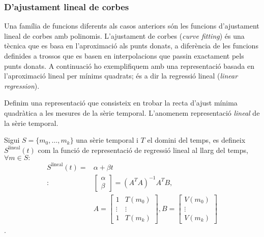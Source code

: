 \subsubsection{D'ajustament lineal de corbes}


Una família de funcions diferents als casos anteriors són les funcions
d'ajustament lineal de corbes amb polinomis.  L'ajustament de corbes
(\emph{curve fitting}) és una tècnica que es basa en l'aproximació als
punts donats, a diferència de les funcions definides a trossos que es
basen en interpolacions que passin exactament pels punts donats.  A
continuació ho exemplifiquem amb una representació basada en
l'aproximació lineal per mínims quadrats; és a dir la regressió lineal
(\emph{linear regression}).


Definim una representació que consisteix en trobar la recta d'ajust
mínima quadràtica a les mesures de la sèrie temporal. L'anomenem
representació \emph{lineal} de la sèrie temporal.
\begin{definition}
  Sigui $S=\{m_0,\ldots,m_k\}$ una sèrie temporal i $T$ el domini del
  temps, es defineix $S^\text{lineal}(t)$ com la funció de
  representació de regressió lineal al llarg del temps, $\forall m \in
  S:$
  \begin{align*}
    S^\text{lineal}(t) = & \alpha + \beta t \\
    :\; & 
    \left[\begin{array}{c}
        \alpha \\
        \beta
      \end{array}\right] 
    = (A^TA)^{-1}A^TB, \\
    & A=\left[\begin{array}{cc}
        1 & T(m_0) \\
        \vdots & \vdots \\
        1 & T(m_k)
      \end{array}\right],
    B=\left[\begin{array}{c}
        V(m_0) \\
        \vdots \\
        V(m_k)
      \end{array}\right]       
   \end{align*}.
\end{definition}



